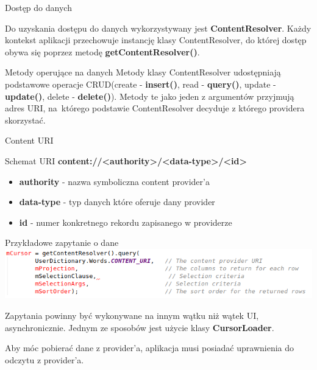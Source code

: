 \documentclass{beamer}
\begin{document}
\begin{frame}{Dostęp do danych}
	\begin{block}{}
		Do uzyskania dostępu do danych wykorzystywany jest \textbf{ContentResolver}. Każdy kontekst aplikacji przechowuje instancję klasy ContentResolver, do której dostęp obywa się poprzez metodę \textbf{getContentResolver()}. 
	\end{block}
	\begin{block}{Metody operujące na danych}
		Metody klasy ContentResolver udostępniają podstawowe operacje CRUD(create - \textbf{insert()}, read - \textbf{query()}, update - \textbf{update()}, delete - \textbf{delete()}). Metody te jako jeden z argumentów przyjmują adres URI, na~którego podstawie ContentResolver decyduje z którego providera skorzystać.
	\end{block}
\end{frame}

\begin{frame}{Content URI}
	\begin{block}{Schemat URI}
		\textbf{content://<authority>/<data-type>/<id>}
		\begin{itemize}
			\item \textbf{authority} - nazwa symboliczna content provider'a
			\item \textbf{data-type} - typ danych które oferuje dany provider
			\item \textbf{id} - numer konkretnego rekordu zapisanego w providerze
		\end{itemize}
	\end{block}
\end{frame}

\begin{frame}{Przykładowe zapytanie o dane}
	\includegraphics[width=\textwidth]{query}
	\begin{block}{}
		Zapytania powinny być wykonywane na innym wątku niż wątek UI, asynchronicznie. Jednym ze sposobów jest użycie klasy \textbf{CursorLoader}.
	\end{block}
	\begin{block}{}
		Aby móc pobierać dane z provider'a, aplikacja musi posiadać uprawnienia do odczytu z provider'a.
	\end{block}
\end{frame}
\end{document}
